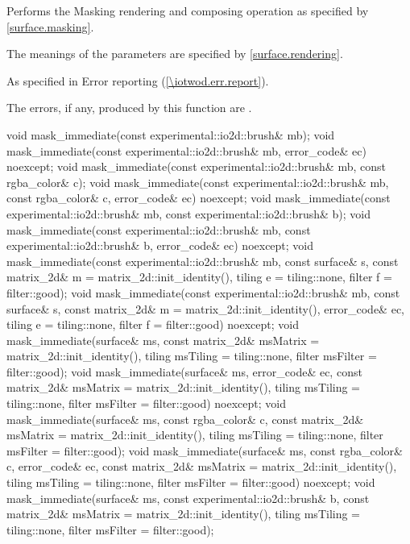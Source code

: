 \begin{itemdescr}
\pnum
\effects
Performs the Masking rendering and composing operation as specified by \ref{surface.masking}.

\pnum
The meanings of the parameters are specified by \ref{surface.rendering}.

\pnum
\throws
As specified in Error reporting (\ref{\iotwod.err.report}).

\pnum
\errors
The errors, if any, produced by this function are .
\end{itemdescr}

\begin{itemdecl}
void mask_immediate(const experimental::io2d::brush& mb);
  void mask_immediate(const experimental::io2d::brush& mb, 
  error_code& ec) noexcept;
void mask_immediate(const experimental::io2d::brush& mb,
  const rgba_color& c);
void mask_immediate(const experimental::io2d::brush& mb,
  const rgba_color& c, error_code& ec) noexcept;
void mask_immediate(const experimental::io2d::brush& mb,
  const experimental::io2d::brush& b);
void mask_immediate(const experimental::io2d::brush& mb,
  const experimental::io2d::brush& b, error_code& ec) noexcept;
void mask_immediate(const experimental::io2d::brush& mb, const surface& s, 
  const matrix_2d& m = matrix_2d::init_identity(), tiling e = tiling::none, 
  filter f = filter::good);
void mask_immediate(const experimental::io2d::brush& mb, const surface& s,
  const matrix_2d& m = matrix_2d::init_identity(), error_code& ec,
  tiling e = tiling::none, filter f = filter::good) noexcept;
void mask_immediate(surface& ms,
  const matrix_2d& msMatrix = matrix_2d::init_identity(),
  tiling msTiling = tiling::none, filter msFilter = filter::good);
void mask_immediate(surface& ms, error_code& ec, 
  const matrix_2d& msMatrix = matrix_2d::init_identity(),
  tiling msTiling = tiling::none, filter msFilter = filter::good) noexcept;
void mask_immediate(surface& ms, const rgba_color& c, 
  const matrix_2d& msMatrix = matrix_2d::init_identity(),
  tiling msTiling = tiling::none, filter msFilter = filter::good);
void mask_immediate(surface& ms, const rgba_color& c, error_code& ec, 
  const matrix_2d& msMatrix = matrix_2d::init_identity(),
  tiling msTiling = tiling::none, filter msFilter = filter::good) noexcept;
void mask_immediate(surface& ms, const experimental::io2d::brush& b, 
  const matrix_2d& msMatrix = matrix_2d::init_identity(),
  tiling msTiling = tiling::none, filter msFilter = filter::good);

\end{itemdecl}
